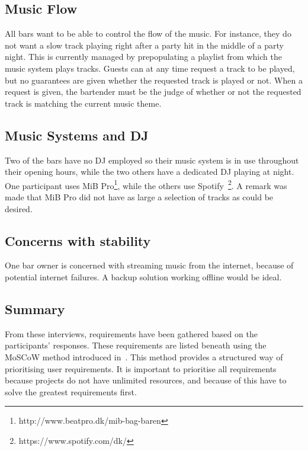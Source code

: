 \subsection{Music Flow}
\label{sub:MusicFlow}

All bars want to be able to control the flow of the music. For instance, they do not want a slow track playing right after a party hit in the middle of a party night. This is currently managed by prepopulating a playlist from which the music system plays tracks. Guests can at any time request a track to be played, but no guarantees are given whether the requested track is played or not. When a request is given, the bartender must be the judge of whether or not the requested track is matching the current music theme.

\subsection{Music Systems and DJ}
\label{sub:differences}
Two of the bars have no DJ employed so their music system is in use throughout their opening hours, while the two others have a dedicated DJ playing at night. One participant uses MiB Pro\footnote{http://www.beatpro.dk/mib-bag-baren}, while the others use Spotify~\footnote{https://www.spotify.com/dk/}. A remark was made that MiB Pro did not have as large a selection of tracks as could be desired.

\subsection{Concerns with stability}
\label{sub:specific_remarks}

One bar owner is concerned with streaming music from the internet, because of potential internet failures. A backup solution working offline would be ideal.

\subsection{Summary}
\label{sub:summary}

From these interviews, requirements have been gathered based on the participants' responses. These requirements are listed beneath using the MoSCoW method introduced in~\cite{benyon2013designing}. This method provides a structured way of prioritising user requirements. It is important to prioritise all requirements because projects do not have unlimited resources, and because of this have to solve the greatest requirements first.

